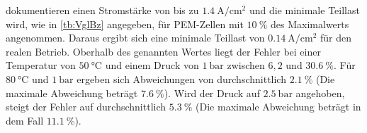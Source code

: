 \citet{chugh_experimental_2020} dokumentieren einen Stromstärke von bis zu $\SI{1,4}{\A\per\cm\squared}$ und die minimale Teillast wird, wie in \ref{tb:VglBz} angegeben, für PEM-Zellen mit $\SI{10}{\%}$ des Maximalwerts angenommen. Daraus ergibt sich eine minimale Teillast von $\SI{0,14}{\A\per\cm\squared}$ für den realen Betrieb. Oberhalb des genannten Wertes liegt der Fehler bei einer Temperatur von $\SI{50}{\degreeCelsius}$ und einem Druck von $\SI{1}{\bar}$ zwischen $6,2$ und $\SI{30,6}{\%}$. Für $\SI{80}{\degreeCelsius}$ und $\SI{1}{\bar}$ ergeben sich Abweichungen von durchschnittlich $\SI{2,1}{\%}$ (Die maximale Abweichung beträgt $\SI{7,6}{\%}$). Wird der Druck auf $\SI{2,5}{\bar}$ angehoben, steigt der Fehler auf durchschnittlich $\SI{5,3}{\%}$ (Die maximale Abweichung beträgt in dem Fall $\SI{11,1}{\%}$).\\

